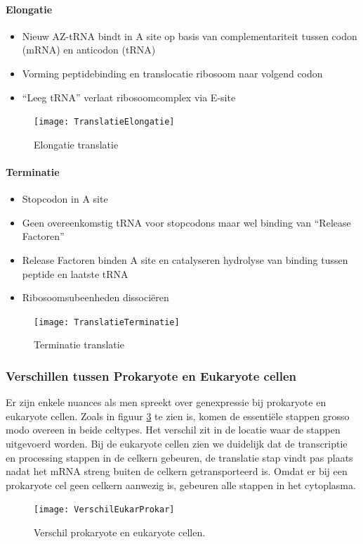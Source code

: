 \documentclass[a4paper,kul]{kulakarticle} %
\begin{document}
\paragraph{Elongatie}
\begin{itemize}
	\item Nieuw AZ-tRNA bindt in A site op basis van complementariteit tussen codon (mRNA) en anticodon (tRNA)
	\item Vorming peptidebinding en translocatie ribosoom naar volgend codon
	\item “Leeg tRNA” verlaat ribosoomcomplex via E-site
\end{itemize}
\begin{figure}[h]
	\centering
	\texttt{[image: TranslatieElongatie]}
	\caption[Elongatie translatie]{Elongatie translatie}
	\label{fig:translatieelongatie}
\end{figure}
\paragraph{Terminatie}
\begin{itemize}
	\item Stopcodon in A site
	\item Geen overeenkomstig tRNA voor stopcodons maar wel binding van “Release Factoren”
	\item Release Factoren binden A site en catalyseren hydrolyse van binding tussen peptide en laatste tRNA
	\item Ribosoomsubeenheden dissociëren
\end{itemize}
\begin{figure}[!h]
	\centering
	\texttt{[image: TranslatieTerminatie]}
	\caption[Terminatie translatie]{Terminatie translatie}
	\label{fig:translatieterminatie}
\end{figure}
\subsubsection{Verschillen tussen Prokaryote en Eukaryote cellen}
Er zijn enkele nuances als men spreekt over genexpressie bij prokaryote en eukaryote cellen. Zoals in figuur \ref{fig:verschileukarprokar} te zien is, komen de essentiële stappen grosso modo overeen in beide celtypes. Het verschil zit in de locatie waar de stappen uitgevoerd worden. Bij de eukaryote cellen zien we duidelijk dat de transcriptie en processing stappen in de celkern gebeuren, de translatie stap vindt pas plaats nadat het mRNA streng buiten de celkern getransporteerd is. Omdat er bij een prokaryote cel geen celkern aanwezig is, gebeuren alle stappen in het cytoplasma.
\begin{figure}[h]
	\centering
	\texttt{[image: VerschilEukarProkar]}
	\caption[Verschil prokaryote en eukaryote]{Verschil prokaryote en eukaryote cellen.}
	\label{fig:verschileukarprokar}
\end{figure}
\end{document}

